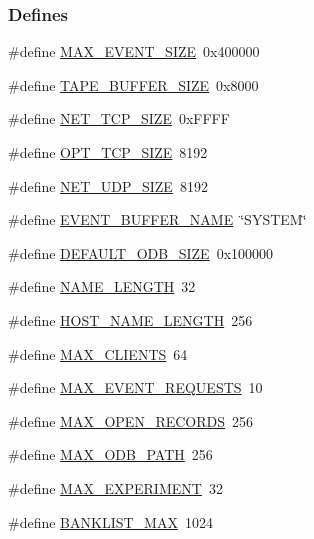 \subsubsection*{Defines}
\begin{DoxyCompactItemize}
\item 
\#define \hyperlink{group__midasincludecode_ga05d5acc365e3342523d84bc4540adc09}{MAX\_\-EVENT\_\-SIZE}~0x400000
\item 
\#define \hyperlink{group__midasincludecode_gab17ef1a258d0569666f69f72ccd50253}{TAPE\_\-BUFFER\_\-SIZE}~0x8000
\item 
\#define \hyperlink{group__midasincludecode_ga31190e25ed33be085ff0af476af2c029}{NET\_\-TCP\_\-SIZE}~0xFFFF
\item 
\#define \hyperlink{group__midasincludecode_ga2d57fe25161f9e5285d9bafd7fb0775d}{OPT\_\-TCP\_\-SIZE}~8192
\item 
\#define \hyperlink{group__midasincludecode_ga75d12e6b30368bb9a7f214430c6e76a6}{NET\_\-UDP\_\-SIZE}~8192
\item 
\#define \hyperlink{group__midasincludecode_gab520c690db83550e545ce6afbb12de3f}{EVENT\_\-BUFFER\_\-NAME}~\char`\"{}SYSTEM\char`\"{}
\item 
\#define \hyperlink{group__midasincludecode_gac5b414ae3a2f854b099c08f5e63e8671}{DEFAULT\_\-ODB\_\-SIZE}~0x100000
\item 
\#define \hyperlink{group__midasincludecode_gaf71324c57f05ff9e24bd384925dd6b17}{NAME\_\-LENGTH}~32
\item 
\#define \hyperlink{group__midasincludecode_ga2010c9ed4ef21c3171de778157b9c494}{HOST\_\-NAME\_\-LENGTH}~256
\item 
\#define \hyperlink{group__midasincludecode_ga0a8f91f93d75a07f0ae45077db45b3eb}{MAX\_\-CLIENTS}~64
\item 
\#define \hyperlink{group__midasincludecode_gabe76a0bd645baa376f4443c59d16e36a}{MAX\_\-EVENT\_\-REQUESTS}~10
\item 
\#define \hyperlink{group__midasincludecode_gaa5445fb29f607c9bfac3cd36efd40cc1}{MAX\_\-OPEN\_\-RECORDS}~256
\item 
\#define \hyperlink{group__midasincludecode_ga78b086c08dd57c930e2997a71a3ae5ee}{MAX\_\-ODB\_\-PATH}~256
\item 
\#define \hyperlink{group__midasincludecode_ga96dcd778f7870d9d3a834f63f7e8506e}{MAX\_\-EXPERIMENT}~32
\item 
\#define \hyperlink{group__midasincludecode_gaab64ba61449c513d2c3a2f4884a38d06}{BANKLIST\_\-MAX}~1024
\item 

\end{DoxyCompactItemize}
